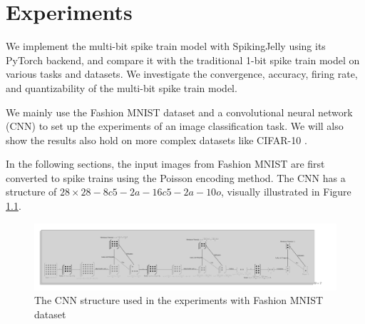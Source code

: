 \chapter{Experiments}
\label{chap:experiments}
We implement the multi-bit spike train model with SpikingJelly \cite{doi:10.1126/sciadv.adi1480} using its PyTorch backend, and compare it with the traditional 1-bit spike train model on various tasks and datasets. We investigate the convergence, accuracy, firing rate, and quantizability of the multi-bit spike train model. 

We mainly use the Fashion MNIST dataset \cite{xiao2017/online} and a convolutional neural network (CNN) to set up the experiments of an image classification task. We will also show the results also hold on more complex datasets like CIFAR-10 \cite{Krizhevsky2009}. 

In the following sections, the input images from Fashion MNIST are first converted to spike trains using the Poisson encoding method. The CNN has a structure of $28\times 28 - 8c5 - 2a - 16c5 - 2a - 10o$, visually illustrated in Figure \ref{fig:scnn_structure}. 

\begin{figure}[!htpb]
    \centering
    \includegraphics[width=\textwidth]{assets/standard/FashionMNIST/snn.pdf}
    \caption{The CNN structure used in the experiments with Fashion MNIST dataset}
    \label{fig:scnn_structure}
\end{figure}

